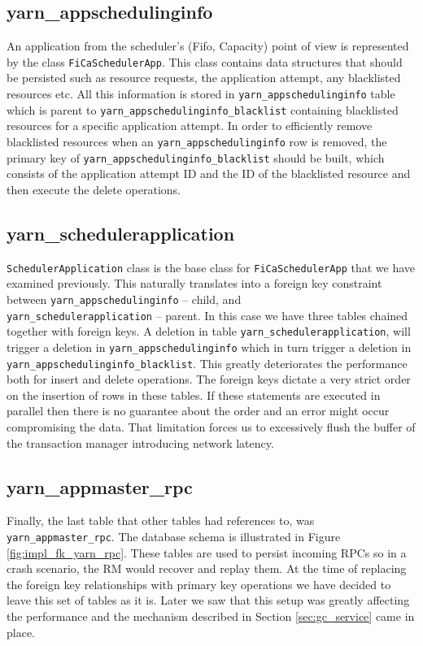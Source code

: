 \subsection{yarn\_appschedulinginfo}
\label{ssec:impl_fk_appschedulinginfo}
An application from the scheduler's (Fifo, Capacity) point of view is
represented by the class \texttt{FiCaSchedulerApp}. This class
contains data structures that should be persisted such as resource
requests, the application attempt, any blacklisted resources etc. All
this information is stored in \texttt{yarn\_appschedulinginfo} table
which is parent to \texttt{yarn\_appschedulinginfo\_blacklist}
containing blacklisted resources for a specific application
attempt. In order to efficiently remove blacklisted resources when an
\texttt{yarn\_appschedulinginfo} row is removed, the primary key of
\texttt{yarn\_appschedulinginfo\_blacklist} should be built, which
consists of the application attempt ID and the ID of the blacklisted
resource and then execute the delete operations.

\subsection{yarn\_schedulerapplication}
\label{ssec:impl_fk_schedulerapp}
\texttt{SchedulerApplication} class is the base class for
\texttt{FiCaSchedulerApp} that we have examined previously. This
naturally translates into a foreign key constraint between
\texttt{yarn\_appschedulinginfo} -- child, and \\
\texttt{yarn\_schedulerapplication} -- parent. In this case we have
three tables chained together with foreign keys. A deletion in table 
\texttt{yarn\_schedulerapplication}, will trigger a deletion in
\texttt{yarn\_appschedulinginfo} which in turn trigger a deletion in
\texttt{yarn\_appschedulinginfo\_blacklist}. This greatly deteriorates
the performance both for insert and delete operations. The foreign
keys dictate a very strict order on the insertion of rows in these
tables. If these statements are executed in parallel then there is no
guarantee about the order and an error might occur compromising the data. That
limitation forces us to excessively flush the buffer of the
transaction manager introducing network latency.

\subsection{yarn\_appmaster\_rpc}
\label{ssec:impl_fk_appmaster_rpc}
Finally, the last table that other tables had references to, was
\texttt{yarn\_appmaster\_rpc}. The database schema is illustrated in
Figure \ref{fig:impl_fk_yarn_rpc}. These tables are used to persist
incoming RPCs so in a crash scenario, the RM would recover and replay
them. At the time of replacing the foreign key relationships with
primary key operations we have decided to leave this set of tables as
it is. Later we saw that this setup was greatly affecting the
performance and the mechanism described in Section
\ref{sec:gc_service} came in place.

